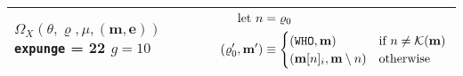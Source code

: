 \begin{longtable}{p{3.5cm} p{12.5cm}}
  \cmidrule(lr){1-1}\cmidrule(lr){2-2}
  \makecell*[l]{
  $\Omega_X(\theta, \varrho, \mu, (\mathbf{m}, \mathbf{e}))$ \\
  \texttt{expunge} = 22 \\
  $g = 10$} &
  $\begin{aligned}
    \text{let } n &= \varrho_{0} \\
    (\varrho'_0, \mathbf{m}') &\equiv \begin{cases}
      (\mathtt{WHO}, \mathbf{m}) &\text{if } n \ne \mathcal{K}(\mathbf{m}) \\
      (\mathbf{m}[n]_i, \mathbf{m} \setminus n) &\text{otherwise} \\
    \end{cases} \\
  \end{aligned}$\\
  \bottomrule
\end{longtable}
